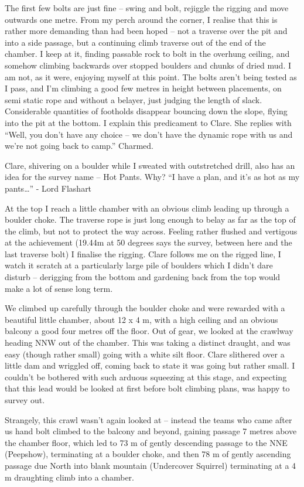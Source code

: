 The first few bolts are just fine -- swing and bolt, rejiggle the
rigging and move outwards one metre. From my perch around the corner, I
realise that this is rather more demanding than had been hoped -- not a
traverse over the pit and into a side passage, but a continuing climb
traverse out of the end of the chamber. I keep at it, finding passable
rock to bolt in the overhung ceiling, and somehow climbing backwards
over stopped boulders and chunks of dried mud. I am not, as it were,
enjoying myself at this point. The bolts aren't being tested as I pass,
and I'm climbing a good few metres in height between placements, on semi
static rope and without a belayer, just judging the length of slack.
Considerable quantities of footholds disappear bouncing down the slope,
flying into the pit at the bottom. I explain this predicament to Clare.
She replies with ``Well, you don't have any choice -- we don't have the
dynamic rope with us and we're not going back to camp.'' Charmed.

Clare, shivering on a boulder while I sweated with outstretched drill,
also has an idea for the survey name -- Hot Pants. Why? ``I have a plan,
and it's as hot as my pants\ldots{}'' - Lord Flashart

At the top I reach a little chamber with an obvious climb leading up
through a boulder choke. The traverse rope is just long enough to belay
as far as the top of the climb, but not to protect the way across.
Feeling rather flushed and vertigous at the achievement (19.44m at 50
degrees says the survey, between here and the last traverse bolt) I
finalise the rigging. Clare follows me on the rigged line, I watch it
scratch at a particularly large pile of boulders which I didn't dare
disturb -- derigging from the bottom and gardening back from the top
would make a lot of sense long term.

We climbed up carefully through the boulder choke and were rewarded with
a beautiful little chamber, about 12 x 4 m, with a high ceiling and an
obvious balcony a good four metres off the floor. Out of gear, we looked
at the crawlway heading NNW out of the chamber. This was taking a
distinct draught, and was easy (though rather small) going with a white
silt floor. Clare slithered over a little dam and wriggled off, coming
back to state it was going but rather small. I couldn't be bothered with
such arduous squeezing at this stage, and expecting that this lead would
be looked at first before bolt climbing plans, was happy to survey out.

Strangely, this crawl wasn't again looked at -- instead the teams who
came after us hand bolt climbed to the balcony and beyond, gaining
passage 7 metres above the chamber floor, which led to 73 m of gently
descending passage to the NNE (Peepshow), terminating at a boulder
choke, and then 78 m of gently ascending passage due North into blank
mountain (Undercover Squirrel) terminating at a 4 m draughting climb
into a chamber.

